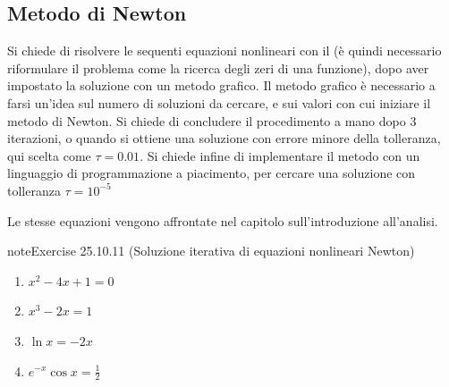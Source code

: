 \documentclass[letterpaper,10pt,italian]{jupyterBook}
\begin{document}
\subsection{Metodo di Newton}
\label{\detokenize{ch/infinitesimal_calculus/derivatives-problems:metodo-di-newton}}\label{\detokenize{ch/infinitesimal_calculus/derivatives-problems:infinitesimal-calculus-derivatives-problems-newton}}
\sphinxAtStartPar
Si chiede di risolvere le sequenti equazioni nonlineari con il {\hyperref[\detokenize{ch/infinitesimal_calculus/derivatives:infinitesimal-calculus-derivatives-applications-newton}]{}} (è quindi necessario riformulare il problema come la ricerca degli zeri di una funzione), dopo aver impostato la soluzione con un metodo grafico. Il metodo grafico è necessario a farsi un’idea sul numero di soluzioni da cercare, e sui valori con cui iniziare il metodo di Newton. Si chiede di concludere il procedimento a mano dopo 3 iterazioni, o quando si ottiene una soluzione con errore minore della tolleranza, qui scelta come \(\tau = 0.01\). Si chiede infine di implementare il metodo con un linguaggio di programmazione a piacimento, per cercare una soluzione con tolleranza \(\tau = 10^{-5}\)

\sphinxAtStartPar
Le stesse equazioni vengono affrontate {\hyperref[\detokenize{ch/infinitesimal_calculus/analysis-problems:infinitesimal-calculus-analysis-problems-bisection}]{}} nel capitolo sull’introduzione all’analisi.
 \label{exercise:ch/infinitesimal_calculus/derivatives-problems-exercise-10}

\begin{sphinxadmonition}{note}{Exercise 25.10.11 (Soluzione iterativa di equazioni nonlineari \sphinxhyphen{} Newton)}


\begin{enumerate}
%
\item {} 
\sphinxAtStartPar
\(x^2 - 4x + 1 = 0 \)

\item {} 
\sphinxAtStartPar
\(x^3 - 2x = 1\)

\item {} 
\sphinxAtStartPar
\(\ln x = - 2 x\)

\item {} 
\sphinxAtStartPar
\(e^{-x} \cos x = \frac{1}{2}\)

\end{enumerate}
\end{sphinxadmonition}
\end{document}
